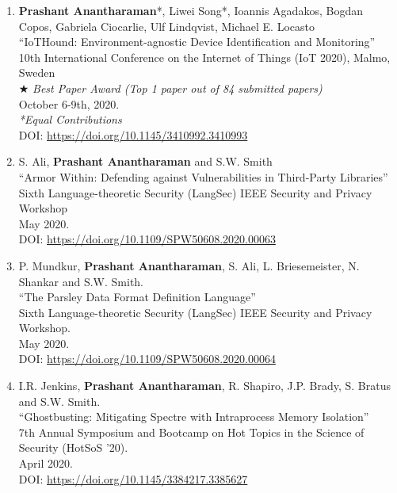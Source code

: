 \documentclass[letterpaper,10pt]{article}
\begin{document}
\begin{enumerate}[label={C\arabic*.}]
\item  {\bf Prashant Anantharaman}*, Liwei Song*, Ioannis Agadakos, Bogdan Copos, Gabriela Ciocarlie, Ulf Lindqvist, Michael E. Locasto \\
  ``IoTHound: Environment-agnostic Device Identification and Monitoring'' \\
  10th International Conference on the Internet of Things (IoT 2020), Malmo, Sweden \\
  $\bigstar$ \textit{Best Paper Award (Top 1 paper out of 84 submitted papers)} \\
  October 6-9th, 2020. \\
  \textit{*Equal Contributions}\\
  DOI: \url{https://doi.org/10.1145/3410992.3410993}
\item    S. Ali, {\bf Prashant Anantharaman} and S.W. Smith  \\
  ``Armor Within: Defending against Vulnerabilities in Third-Party Libraries'' \\
  Sixth Language-theoretic Security (LangSec) IEEE Security and Privacy Workshop \\
  May 2020.\\
  DOI: \url{https://doi.org/10.1109/SPW50608.2020.00063}
\item P. Mundkur, {\bf Prashant Anantharaman}, S. Ali, L. Briesemeister, N. Shankar and S.W. Smith. \\
  ``The Parsley Data Format Definition Language'' \\
  Sixth Language-theoretic Security (LangSec) IEEE Security and Privacy Workshop. \\
  May 2020.\\
  DOI: \url{https://doi.org/10.1109/SPW50608.2020.00064}
\item I.R. Jenkins, {\bf Prashant Anantharaman}, R. Shapiro, J.P. Brady, S. Bratus and S.W. Smith. \\
  ``Ghostbusting: Mitigating Spectre with Intraprocess Memory Isolation'' \\
  7th Annual Symposium and Bootcamp on Hot Topics in the Science of Security (HotSoS '20). \\
  April 2020.\\
  DOI: \url{https://doi.org/10.1145/3384217.3385627}



\end{enumerate}
\end{document}

